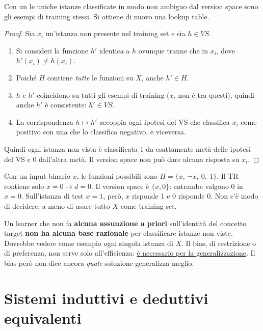 \begin{teorema}
Con un  le uniche istanze classificate in modo non ambiguo dal version space sono gli
esempi di training stessi. Si ottiene di nuovo una lookup table.
\end{teorema}
\begin{proof}
Sia $x_i$ un'istanza non presente nel training set e sia $h\in VS$.
\begin{enumerate}
  \item Si consideri la funzione $h'$ identica a $h$ ovunque tranne che in $x_i$, dove $h'(x_i)\neq h(x_i)$.
  \item Poiché $H$ contiene \emph{tutte} le funzioni su $X$, anche $h'\in H$.
  \item $h$ e $h'$ coincidono su tutti gli esempi di training ($x_i$ non è tra questi), quindi anche $h'$ è
        consistente: $h'\in VS$.
  \item La corrispondenza $h\mapsto h'$ accoppia ogni ipotesi del VS che classifica $x_i$ come positivo con una che
        lo classifica negativo, e viceversa.
\end{enumerate}
Quindi ogni istanza non vista è classificata 1 da esattamente metà delle ipotesi del VS e 0 dall'altra metà. Il
version space non può dare alcuna risposta su $x_i$.
\end{proof}

\begin{esempio}
Con un input binario $x$, le funzioni possibili sono $H=\{x,\ \neg x,\ 0,\ 1\}$. Il TR contiene solo $x=0\mapsto
d=0$. Il version space è $\{x, 0\}$: entrambe valgono 0 in $x=0$. Sull'istanza di test $x=1$, però, $x$ risponde
1 e $0$ risponde 0. Non c'è modo di decidere, a meno di usare tutto $X$ come training set.
\end{esempio}

\begin{idea}
Un learner che non fa \textbf{alcuna assunzione a priori} sull'identità del concetto target \textbf{non ha alcuna
base razionale} per classificare istanze non viste. Dovrebbe vedere come esempio ogni singola istanza di $X$. Il
bias, di restrizione o di preferenza, non serve solo all'efficienza: \uline{è necessario per la
generalizzazione}. Il bias però non dice ancora \emph{quale} soluzione generalizza meglio.
\end{idea}

\section{Sistemi induttivi e deduttivi equivalenti}

